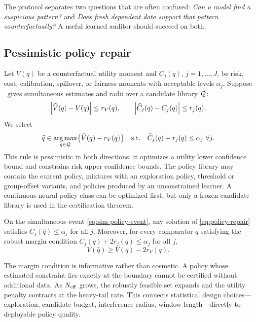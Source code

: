 The protocol separates two questions that are often confused: \emph{Can a model find a suspicious pattern?} and \emph{Does fresh dependent data support that pattern counterfactually?} A useful learned auditor should succeed on both.

\subsection{Pessimistic policy repair}
Let $V(q)$ be a counterfactual utility moment and $C_j(q)$, $j=1,\ldots,J$, be risk, cost, calibration, spillover, or fairness moments with acceptable levels $\alpha_j$. Suppose \COMET\ gives simultaneous estimates and radii over a candidate library $\mathcal{Q}$:
\begin{equation}
\left|\widehat V(q)-V(q)\right|\le r_V(q),
\qquad
\left|\widehat C_j(q)-C_j(q)\right|\le r_j(q).
\label{eq:sim-policy-event}
\end{equation}
We select
\begin{equation}
\widehat q\in\operatorname*{arg\,max}_{q\in\mathcal{Q}}
\bigl\{\widehat V(q)-r_V(q)\bigr\}
\quad\text{s.t.}\quad
\widehat C_j(q)+r_j(q)\le\alpha_j
\ \forall j.
\label{eq:policy-repair}
\end{equation}
This rule is pessimistic in both directions: it optimizes a utility lower confidence bound and constrains risk upper confidence bounds. The policy library may contain the current policy, mixtures with an exploration policy, threshold or group-offset variants, and policies produced by an unconstrained learner. A continuous neural policy class can be optimized first, but only a frozen candidate library is used in the certification theorem.

\begin{proposition}
\label{prop:repair}
On the simultaneous event \cref{eq:sim-policy-event}, any solution of \cref{eq:policy-repair} satisfies $C_j(\widehat q)\le\alpha_j$ for all $j$. Moreover, for every comparator $q$ satisfying the robust margin condition $C_j(q)+2r_j(q)\le\alpha_j$ for all $j$,
\begin{equation}
    V(\widehat q)\ge V(q)-2r_V(q).
    \label{eq:repair-utility}
\end{equation}
\end{proposition}

The margin condition is informative rather than cosmetic. A policy whose estimated constraint lies exactly at the boundary cannot be certified without additional data. As $N_{\mathrm{eff}}$ grows, the robustly feasible set expands and the utility penalty contracts at the heavy-tail rate. This connects statistical design choices---exploration, candidate budget, interference radius, window length---directly to deployable policy quality.

